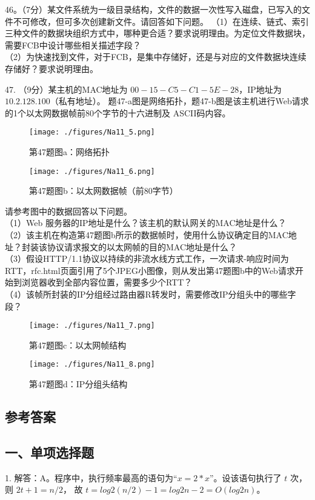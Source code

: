 46。（7分）某文件系统为一级目录结构，文件的数据一次性写入磁盘，已写入的文件不可修改，但可多次创建新文件。请回答如下问题。
（1）在连续、链式、索引三种文件的数据块组织方式中，哪种更合适？要求说明理由。为定位文件数据块，需要FCB中设计哪些相关描述字段？ \\
（2）为快速找到文件，对于FCB，是集中存储好，还是与对应的文件数据块连续存储好？要求说明理由。

47. （9分）某主机的MAC地址为 $00-15-C5-C1-5E-28$，IP地址为 $10.2.128.100$（私有地址）。 题47-a图是网络拓扑，题47-b图是该主机进行Web请求的1个以太网数据帧前80个字节的十六进制及 ASCII码内容。
\begin{figure}[ht]
\centering
\texttt{[image: ./figures/Na11\_5.png]}
\caption{第47题图a：网络拓扑} \label{Na11_fig5}
\end{figure}

\begin{figure}[ht]
\centering
\texttt{[image: ./figures/Na11\_6.png]}
\caption{第47题图b：以太网数据帧（前80字节）} \label{Na11_fig6}
\end{figure}

请参考图中的数据回答以下问题。 \\
（1）Web 服务器的IP地址是什么？该主机的默认网关的MAC地址是什么？ \\
（2）该主机在构造第47题图b所示的数据帧时，使用什么协议确定目的MAC地址？封装该协议请求报文的以太网帧的目的MAC地址是什么？ \\
（3）假设HTTP/1.1协议以持续的非流水线方式工作，一次请求-响应时间为RTT，rfc.html页面引用了5个JPEG小图像，则从发出第47题图b中的Web请求开始到浏览器收到全部内容位置，需要多少个RTT？ \\
（4）该帧所封装的IP分组经过路由器R转发时，需要修改IP分组头中的哪些字段？ \\
\begin{figure}[ht]
\centering
\texttt{[image: ./figures/Na11\_7.png]}
\caption{第47题图c：以太网帧结构} \label{Na11_fig7}
\end{figure}
\begin{figure}[ht]
\centering
\texttt{[image: ./figures/Na11\_8.png]}
\caption{第47题图d：IP分组头结构} \label{Na11_fig8}
\end{figure}




\subsection{参考答案}
\subsection{一、单项选择题}
1. 解答：A。程序中，执行频率最高的语句为“$x=2*x$”。设该语句执行了 $t$ 次，则 $2t+1=n/2$， 故 $t=log2(n/2)-1=log2n-2= O(log2n)$。

